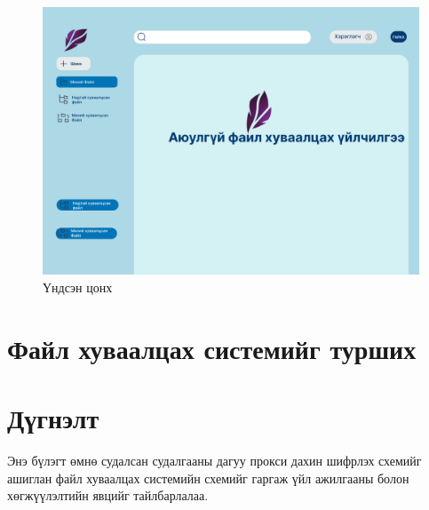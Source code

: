 \begin{figure}[ht]
    \centering
    \includegraphics[scale=0.25]{Figures/Main.png}
    \caption[Usecase diagram]{Үндсэн цонх}
    \label{fig:home}
\end{figure}

\section{Файл хуваалцах системийг турших}


\section{Дүгнэлт}
Энэ бүлэгт өмнө судалсан судалгааны дагуу прокси дахин шифрлэх схемийг ашиглан файл хуваалцах системийн схемийг гаргаж үйл ажилгааны болон хөгжүүлэлтийн явцийг тайлбарлалаа.